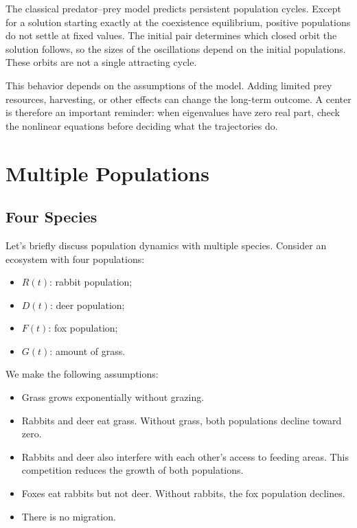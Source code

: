 \documentclass[10pt,letterpaper]{article}
\begin{document}
The classical predator--prey model predicts persistent
population cycles. Except for a solution starting exactly at the coexistence equilibrium,
positive populations do not settle at fixed values. The initial pair
determines which closed orbit the solution follows, so the sizes of the oscillations depend
on the initial populations. These orbits are not a single attracting cycle.

This behavior depends on the assumptions of the model.
Adding limited prey resources, harvesting, or other
effects can change the long-term outcome. A center is therefore an
important reminder: when eigenvalues have zero real part, check the
nonlinear equations before deciding what the trajectories do.


\section{Multiple Populations}

\subsection{Four Species}

Let's briefly discuss population dynamics with multiple
species. Consider an ecosystem with four populations:
\begin{itemize}
    \item $R(t)$: rabbit population;
    \item $D(t)$: deer population;
    \item $F(t)$: fox population;
    \item $G(t)$: amount of grass.
\end{itemize}

We make the following assumptions:
\begin{itemize}
    \item Grass grows exponentially without grazing.
    \item Rabbits and deer eat grass. Without grass,
    both populations decline toward zero.
    \item Rabbits and deer also interfere with each
    other's access to feeding areas. This competition
    reduces the growth of both populations.
    \item Foxes eat rabbits but not deer.
    Without rabbits, the fox population declines.
    \item There is no migration.
\end{itemize}
\end{document}
